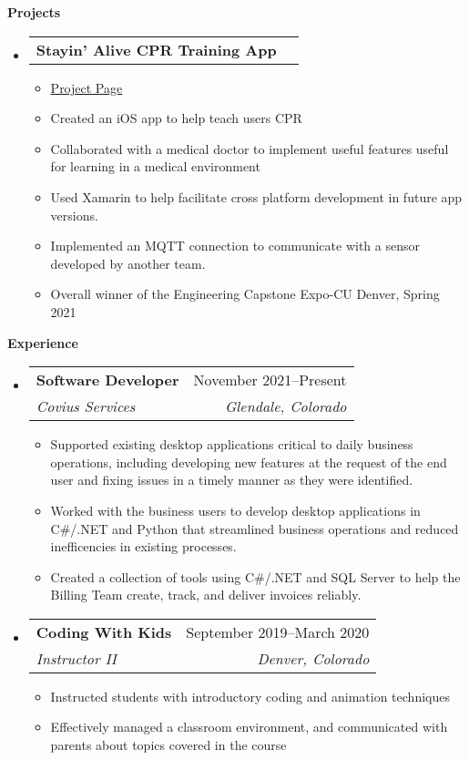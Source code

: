 \documentclass[letterpaper,12pt]{article}[leftmargin=*]
\makeatletter
\def \entryspacing {-0pt}
\renewcommand{\section}[2]{\vspace{5pt}
  \colorbox{secondary}{\color{white}\raggedbottom\normalsize\textbf{{#1}{\hspace{7pt}#2}}}
}
\newcommand{\resumeEntryStart}{\begin{itemize}[leftmargin=2.5mm]}
\newcommand{\resumeEntryEnd}{\end{itemize}\vspace{\entryspacing}}
\newcommand{\resumeItemListStart}{\begin{itemize}[leftmargin=4.5mm]}
\newcommand{\resumeItemListEnd}{\end{itemize}}
\newcommand{\resumeItem}[1]{
  \item\small{
    {#1 \vspace{-2pt}}
  }
}
\newcommand{\resumeEntryTSDL}[4]{
  \vspace{-1pt}\item[]
    \begin{tabularx}{0.97\textwidth}{X@{\hspace{60pt}}r}
      \textbf{\color{primary}#1} & {\firabook\color{accent}\small#2} \\
      \textit{\color{accent}\small#3} & \textit{\color{accent}\small#4} \\
    \end{tabularx}\vspace{-6pt}
}
\newcommand{\resumeEntryTD}[2]{
  \vspace{-1pt}\item[]
    \begin{tabularx}{0.97\textwidth}{X@{\hspace{60pt}}r}
      \textbf{\color{primary}#1} & {\firabook\color{accent}\small#2} \\
    \end{tabularx}\vspace{-6pt}
}
\makeatother
\begin{document}
\section{\faFlask}{Projects}

  \resumeEntryStart
    \resumeEntryTD
      {Stayin' Alive CPR Training App}{}
      
    \resumeItemListStart
      \resumeItem {\href{https://engineering.ucdenver.edu/current-students/capstone-expo/sp21/csci10}{Project Page}}
      \resumeItem {Created an iOS app to help teach users CPR}
      \resumeItem {Collaborated with a medical doctor to implement useful features useful for learning in a medical environment}
      \resumeItem {Used Xamarin to help facilitate cross platform development in future app versions.}
      \resumeItem {Implemented an MQTT connection to communicate with a sensor developed by another team. }
      \resumeItem {Overall winner of the Engineering Capstone Expo-CU Denver, Spring 2021}
    \resumeItemListEnd
  \resumeEntryEnd


\section{\faPieChart}{Experience}

  \resumeEntryStart
  \resumeEntryTSDL
  {Software Developer}{November 2021--Present}
  {Covius Services}{Glendale, Colorado}
   
  \resumeItemListStart
  \resumeItem{Supported existing desktop applications critical to daily business operations, including developing new features at the request of the end user and fixing issues in a timely manner as they were identified.}
  \resumeItem{Worked with the business users to develop desktop applications in C\#/.NET and Python that streamlined business operations and reduced inefficencies in existing processes.}
  \resumeItem{Created a collection of tools using C\#/.NET and SQL Server to help the Billing Team create, track, and deliver invoices reliably.}
  \resumeItemListEnd
\resumeEntryEnd

\resumeEntryStart
\resumeEntryTSDL
  {Coding With Kids}{September 2019--March 2020}
  {Instructor II}{Denver, Colorado}
\resumeItemListStart
  \resumeItem {Instructed students with introductory coding and animation techniques}
  \resumeItem {Effectively managed a classroom environment, and communicated with parents about topics covered in the course} 
\resumeItemListEnd
\resumeEntryEnd
\end{document}
